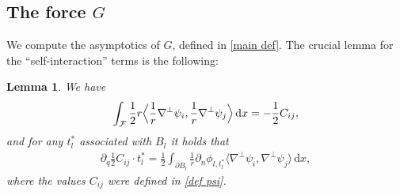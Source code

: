 \documentclass[10pt]{amsart}
\newtheorem{lemma}[theorem]{Lemma}
\theoremstyle{definition}
\newcommand\bscalar[2]{\bigl\langle #1,#2\bigr\rangle}
\newcommand\Bscalar[2]{\Bigl\langle #1,#2\Bigr\rangle}
\newcommand\eq{=}
\newcommand\dd{\,\mathrm{d}}
\newcommand\dx{\dd x}
\let\de\partial
\begin{document}
\subsection{The force $G$}
We compute the asymptotics of $G$, defined in \ref{main def}. The crucial lemma for the ``self-interaction'' terms is the following:

\begin{lemma}\label{Lem:EnergyDerivative}
We have
\begin{align*}
\int_{\mathcal{F}} \frac{1}{2}r\Bscalar{\frac{1}{r}\nabla^\perp\psi_i}{\frac{1}{r}\nabla^\perp\psi_j}\dx\eq-\frac{1}{2}C_{ij},
\end{align*}
and for any $t_l^*$ associated with $B_l$ it holds that
\begin{align*}
\de_{q}\frac{1}{2}C_{ij}\cdot t_l^*\eq\frac{1}{2}\int_{\de B_l}\frac{1}{r}\de_n\phi_{l,t_l^*}\bscalar{\nabla^\perp\psi_i}{\nabla^\perp\psi_j}\dx,
\end{align*}
where the values $C_{ij}$ were defined in \ref{def psi}.
\end{lemma}
\end{document}
